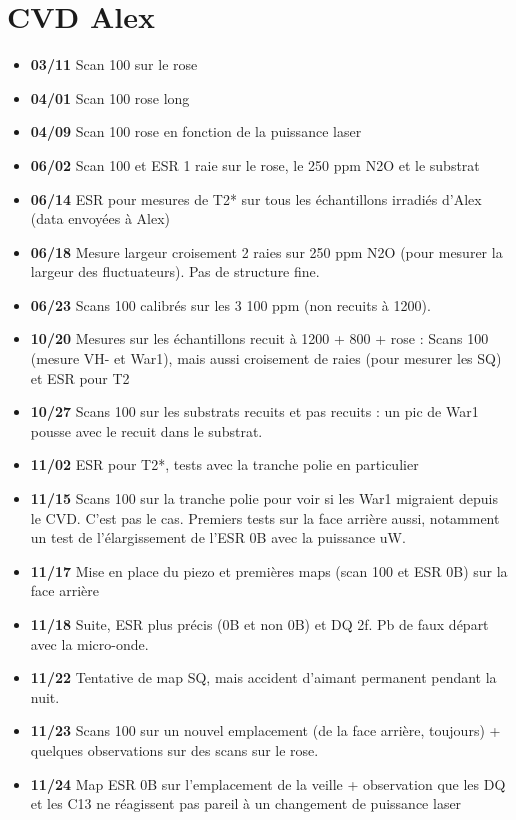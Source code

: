 \documentclass[a4paper]{article}
\begin{document}
\section{CVD Alex}
\begin{itemize}
\item \textbf{03/11} Scan 100 sur le rose
\item \textbf{04/01} Scan 100 rose long
\item \textbf{04/09} Scan 100 rose en fonction de la puissance laser
\item \textbf{06/02} Scan 100 et ESR 1 raie sur le rose, le 250 ppm N2O et le substrat
\item \textbf{06/14} ESR pour mesures de T2* sur tous les échantillons irradiés d'Alex (data envoyées à Alex)
\item \textbf{06/18} Mesure largeur croisement 2 raies sur 250 ppm N2O (pour mesurer la largeur des fluctuateurs). Pas de structure fine.
\item \textbf{06/23} Scans 100 calibrés sur les 3 100 ppm (non recuits à 1200).
\item \textbf{10/20} Mesures sur les échantillons recuit à 1200 + 800 + rose : Scans 100 (mesure VH- et War1), mais aussi croisement de raies (pour mesurer les SQ) et ESR pour T2
\item \textbf{10/27} Scans 100 sur les substrats recuits et pas recuits : un pic de War1 pousse avec le recuit dans le substrat.
\item \textbf{11/02} ESR pour T2*, tests avec la tranche polie en particulier
\item \textbf{11/15} Scans 100 sur la tranche polie pour voir si les War1 migraient depuis le CVD. C'est pas le cas. Premiers tests sur la face arrière aussi, notamment un test de l'élargissement de l'ESR 0B avec la puissance uW.
\item \textbf{11/17} Mise en place du piezo et premières maps (scan 100 et ESR 0B) sur la face arrière
\item \textbf{11/18} Suite, ESR plus précis (0B et non 0B) et DQ 2f. Pb de faux départ avec la micro-onde.
\item \textbf{11/22} Tentative de map SQ, mais accident d'aimant permanent pendant la nuit.
\item \textbf{11/23} Scans 100 sur un nouvel emplacement (de la face arrière, toujours) + quelques observations sur des scans sur le rose.
\item \textbf{11/24} Map ESR 0B sur l'emplacement de la veille + observation que les DQ et les C13 ne réagissent pas pareil à un changement de puissance laser

\end{itemize}
\end{document}
